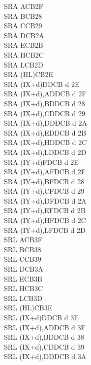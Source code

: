 \begin{multicols}{3}
{\begin{tabbing}
        SRA A\>CB2F\\
        SRA B\>CB28\\
        SRA C\>CB29\\
        SRA D\>CB2A\\
        SRA E\>CB2B\\
        SRA H\>CB2C\\
        SRA L\>CB2D\\
        SRA (HL)\>CB2E\\
        SRA (IX+d)\>DDCB d 2E\\
        SRA (IX+d),A\UNDOC\>DDCB d 2F\\
        SRA (IX+d),B\UNDOC\>DDCB d 28\\
        SRA (IX+d),C\UNDOC\>DDCB d 29\\
        SRA (IX+d),D\UNDOC\>DDCB d 2A\\
        SRA (IX+d),E\UNDOC\>DDCB d 2B\\
        SRA (IX+d),H\UNDOC\>DDCB d 2C\\
        SRA (IX+d),L\UNDOC\>DDCB d 2D\\
        SRA (IY+d)\>FDCB d 2E\\
        SRA (IY+d),A\UNDOC\>FDCB d 2F\\
        SRA (IY+d),B\UNDOC\>FDCB d 28\\
        SRA (IY+d),C\UNDOC\>FDCB d 29\\
        SRA (IY+d),D\UNDOC\>FDCB d 2A\\
        SRA (IY+d),E\UNDOC\>FDCB d 2B\\
        SRA (IY+d),H\UNDOC\>FDCB d 2C\\
        SRA (IY+d),L\UNDOC\>FDCB d 2D\\
        SRL A\>CB3F\\
        SRL B\>CB38\\
        SRL C\>CB39\\
        SRL D\>CB3A\\
        SRL E\>CB3B\\
        SRL H\>CB3C\\
        SRL L\>CB3D\\
        SRL (HL)\>CB3E\\
        SRL (IX+d)\>DDCB d 3E\\
        SRL (IX+d),A\UNDOC\>DDCB d 3F\\
        SRL (IX+d),B\UNDOC\>DDCB d 38\\
        SRL (IX+d),C\UNDOC\>DDCB d 39\\
        SRL (IX+d),D\UNDOC\>DDCB d 3A\\

\end{tabbing}}
\end{multicols}
